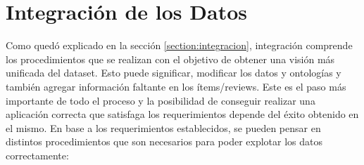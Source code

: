 \chapter{Integración de los Datos}
\label{chapter:integracion}

Como quedó explicado en la sección \ref{section:integracion}, integración comprende los procedimientos que se realizan con el objetivo de obtener una
visión más unificada del dataset.
Esto puede significar, modificar los datos y ontologías y también agregar información faltante en los ítems/reviews.
Este es el paso más importante de todo el proceso y la posibilidad de conseguir realizar una aplicación correcta que satisfaga los requerimientos
depende del éxito obtenido en el mismo.
En base a los requerimientos establecidos, se pueden pensar en distintos procedimientos que son necesarios para poder explotar los datos
correctamente:
\\
\\
